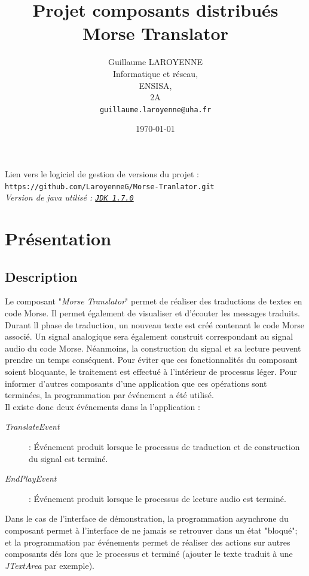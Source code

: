 \documentclass[a4paper,11pt]{article}
\title{\LARGE{Projet composants distribués}\\\bigskip \textbf{Morse Translator}}
\author{Guillaume LAROYENNE\\
   Informatique et réseau,\\
   ENSISA,\\
   2A\\
   \bigskip
   \texttt{guillaume.laroyenne@uha.fr}
   }
\date{\today}
\begin{document}
  \maketitle
  \vspace{2cm}
  \begin{center}
      \large{Lien vers le logiciel de gestion de versions du projet :} \texttt{https://github.com/LaroyenneG/Morse-Tranlator.git}
      \\[2cm]
      \textit{Version de java utilisé : \texttt{\underline{JDK 1.7.0}}}
  \end{center}
      
  \newpage

\tableofcontents

\newpage

  \section{Présentation}
  \subsection{Description}
  Le composant "\textit{Morse Translator}" permet de réaliser des traductions de textes en code Morse. Il permet également de visualiser et d'écouter les messages traduits.
  Durant ll phase de traduction, un nouveau texte est créé contenant le code Morse associé. Un signal analogique sera également construit correspondant au signal audio du code Morse. Néanmoins, la construction du signal et sa lecture peuvent prendre un temps conséquent. Pour éviter que ces fonctionnalités du composant soient bloquante, le traitement est effectué à l'intérieur de processus léger. Pour informer d'autres composants d'une application que ces opérations sont terminées, la programmation par événement a été utilisé.\\
  Il existe donc deux événements dans la l'application :
  \begin{description}
      \item[\textit{TranslateEvent}] : Événement produit lorsque le processus de traduction et de construction du signal est terminé.
      \item[\textit{EndPlayEvent}] : Événement produit lorsque le processus de lecture audio est terminé.
  \end{description}
  Dans le cas de l'interface de démonstration, la programmation asynchrone du composant permet à l'interface de ne jamais se retrouver dans un état "bloqué"; et la programmation par événements permet de réaliser des actions sur autres composants dés lors que le processus et terminé (ajouter le texte traduit à une \textit{JTextArea} par exemple).
	
\end{document}
